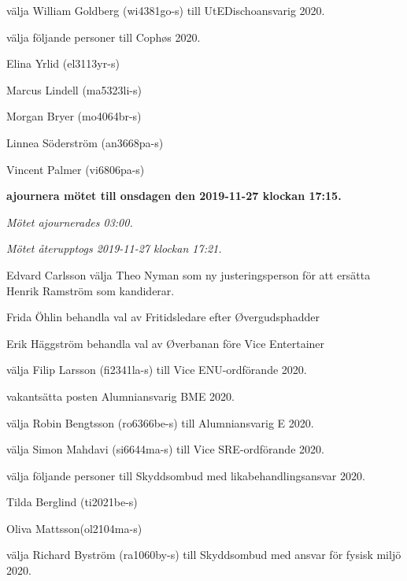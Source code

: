 \documentclass[10pt]{article}
\begin{document}
\begin{paragrafer}
\begin{paralist}

    \Mba välja William Goldberg (wi4381go-s) till UtEDischoansvarig 2020. 

    \Mba välja följande personer till Cophøs 2020.
    \begin{tightdashlist}
        \item Elina Yrlid (el3113yr-s)
        \item Marcus Lindell (ma5323li-s)
        \item Morgan Bryer (mo4064br-s)
        \item Linnea Söderström (an3668pa-s)
        \item Vincent Palmer (vi6806pa-s)
    \end{tightdashlist}

    \textbf{\Mba ajournera mötet till onsdagen den 2019-11-27 klockan 17:15.}
    
    \emph{Mötet ajournerades 03:00.}

    \emph{Mötet återupptogs 2019-11-27 klockan 17:21.}

    Edvard Carlsson \ypa välja Theo Nyman som ny justeringsperson för att ersätta Henrik Ramström som kandiderar. 

    \textbf{\Mbaby}

    Frida Öhlin \ypa behandla val av Fritidsledare efter Øvergudsphadder

    \textbf{\Mbaby}

    Erik Häggström \ypa behandla val av Øverbanan före Vice Entertainer

    \textbf{\Mbaby}

    \Mba välja Filip Larsson (fi2341la-s) till Vice ENU-ordförande 2020.
    
    \Mba vakantsätta posten Alumniansvarig BME 2020.
 
    \Mba välja Robin Bengtsson (ro6366be-s) till Alumniansvarig E 2020.

    \Mba välja Simon Mahdavi (si6644ma-s) till Vice SRE-ordförande 2020.

    \newpage 

    \Mba välja följande personer till Skyddsombud med likabehandlingsansvar 2020.
    \begin{tightdashlist}
        \item Tilda Berglind (ti2021be-s)
        \item Oliva Mattsson(ol2104ma-s)
    \end{tightdashlist}

    \Mba välja Richard Byström (ra1060by-s) till Skyddsombud med ansvar för fysisk miljö 2020.
    

\end{paralist}
\end{paragrafer}
\end{document}
